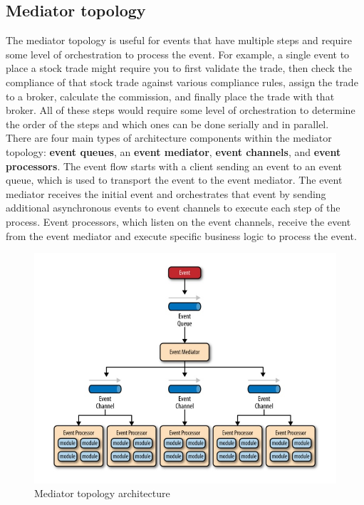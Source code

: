 \subsection{Mediator topology}
The mediator topology is useful for events that have multiple steps and require some level of orchestration to process the event. For example, a single event to place a stock trade might require you to first validate the trade, then check the compliance of that stock trade against various compliance rules, assign the trade to a broker, calculate the commission, and finally place the trade with that broker. All of these steps would require some level of orchestration to determine the order of the steps and which ones can be done serially and in parallel.  \\
There are four main types of architecture components within the mediator topology: \textbf{event queues}, an \textbf{event mediator}, \textbf{event channels}, and \textbf{event processors}. The event flow starts with a client sending an event to an event queue, which is used to transport the event to the event mediator. The event mediator receives the initial event and orchestrates that event by sending additional asynchronous events to event channels to execute each step of the process. Event processors, which listen on the event channels, receive the event from the event mediator and execute specific business logic to process the event.
\Spazio
\begin{figure} [H]
	\centering
	\includegraphics[scale=1]{Img/mediator-topology}
	\caption{Mediator topology architecture}\label{}
\end{figure}

